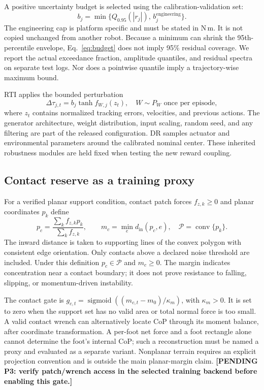 \documentclass[11pt,a4paper]{article}
\newcommand{\pending}[1]{\textbf{[PENDING #1]}}
\newcommand{\sigmoid}{\operatorname{sigmoid}}
\begin{document}
A positive uncertainty budget is selected using the calibration-validation set:
\begin{equation}
 b_j=\min\{Q_{0.95}(|r_j|),\,b_j^{\mathrm{engineering}}\}.
 \label{eq:budget}
\end{equation}
The engineering cap is platform specific and must be stated in N\,m. It is not copied unchanged from another robot. Because a minimum can shrink the 95th-percentile envelope, Eq.~\eqref{eq:budget} does not imply 95\% residual coverage. We report the actual exceedance fraction, amplitude quantiles, and residual spectra on separate test logs. Nor does a pointwise quantile imply a trajectory-wise maximum bound.

RTI applies the bounded perturbation
\begin{equation}
 \Delta\tau_{j,t}=b_j\tanh f_{W,j}(z_t),\quad W\sim P_W\text{ once per episode},
\end{equation}
where $z_t$ contains normalized tracking errors, velocities, and previous actions. The generator architecture, weight distribution, input scaling, random seed, and any filtering are part of the released configuration. DR samples actuator and environmental parameters around the calibrated nominal center. These inherited robustness modules are held fixed when testing the new reward coupling.

\subsection{Contact reserve as a training proxy}
For a verified planar support condition, contact patch forces $f_{z,k}\geq0$ and planar coordinates $p_k$ define
\begin{equation}
 p_c=\frac{\sum_k f_{z,k}p_k}{\sum_k f_{z,k}},\qquad
 m_c=\min_e d_{\mathrm{in}}(p_c,e),\quad \mathcal P=\operatorname{conv}\{p_k\}.
\end{equation}
The inward distance is taken to supporting lines of the convex polygon with consistent edge orientation. Only contacts above a declared noise threshold are included. Under this definition $p_c\in\mathcal P$ and $m_c\geq0$. The margin indicates concentration near a contact boundary; it does not prove resistance to falling, slipping, or momentum-driven instability.

The contact gate is $g_{c,t}=\sigmoid((m_{c,t}-m_0)/\kappa_m)$, with $\kappa_m>0$. It is set to zero when the support set has no valid area or total normal force is too small. A valid contact wrench can alternatively locate CoP through its moment balance, after coordinate transformation. A per-foot net force and a foot rectangle alone cannot determine the foot's internal CoP; such a reconstruction must be named a proxy and evaluated as a separate variant. Nonplanar terrain requires an explicit projection convention and is outside the main planar-margin claim. \pending{P3: verify patch/wrench access in the selected training backend before enabling this gate.}
\end{document}
